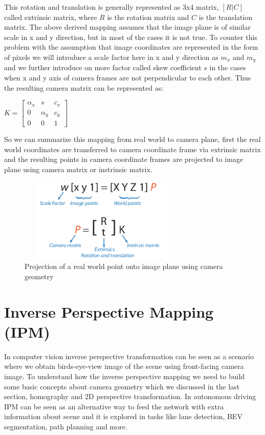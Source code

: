    This rotation and translation is generally represented as 3x4 matrix, $[R | C ]$ called extrinsic matrix, where $R$ is the rotation matrix and $C$ is the translation matrix. The above derived mapping assumes that the image plane is of similar scale in x and y direction, but in most of the cases it is not true. To counter this problem with the assumption that image coordinates are represented in the form of pixels we will introduce a scale factor here in x and y direction as $m_{x}$ and $m_{y}$ and we further introduce on more factor called skew coefficient $s$ in the cases when x and y axis of camera frames are not perpendicular to each other. Thus the resulting camera matrix can be represented as:
        \begin{center}
$K =  \begin{bmatrix} \alpha_{x} & s &c_{x} \\  0 & \alpha_{y} & c_{y}  \\  0  &0 &1 \end{bmatrix}$
    \end{center}
    
    So we can summarize this mapping from real world to camera plane, first the real world coordinates are transferred to camera coordinate frame via extrinsic matrix and the resulting points in camera coordinate frames are projected to image plane using camera matrix or instrinsic matrix. 
        \begin{figure}[h]
    \centering
    \includegraphics[width=8cm, height =4cm]{images/extrinsic_intrinsic.png}
    \caption{ Projection of a real world point onto image plane using camera geometry \cite{10.5555/861369}}
    \end{figure}
    
   
   
    \section{Inverse Perspective Mapping (IPM)}
     In computer vision inverse perspective transformation can be seen as a scenario where we obtain birds-eye-view image of the scene using front-facing camera image. To understand how the inverse perspective mapping we need to build some basic concepts about camera geometry which we discussed in the last section, homography and 2D perspective transformation. In autonomous driving IPM can be seen as an alternative way to feed the network with extra information about scene and it is explored in tasks like lane detection, BEV segmentation, path planning and more. 
     
